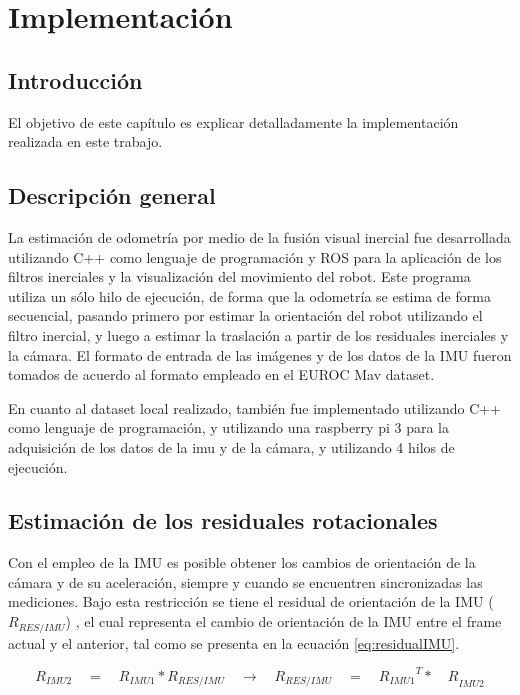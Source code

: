 \chapter{Implementación}
\label{capitulo4}


\section{Introducción}
El objetivo de este capítulo es explicar detalladamente la implementación realizada en este trabajo.
\clearpage



\section{Descripción general}\label{seccion-corte}

La estimación de odometría por medio de la fusión visual inercial fue desarrollada utilizando C++ como lenguaje de programación y ROS para la aplicación de los filtros inerciales y la visualización del movimiento del robot. Este programa utiliza un sólo hilo de ejecución, de forma que la odometría se estima de forma secuencial, pasando primero por estimar la orientación del robot utilizando el filtro inercial, y luego a estimar la traslación a partir de los residuales inerciales y la cámara. El formato de entrada de las imágenes y de los datos de la IMU fueron tomados de acuerdo al formato empleado en el EUROC Mav dataset.

En cuanto al dataset local realizado, también fue implementado utilizando C++ como lenguaje de programación, y utilizando una raspberry pi 3 para la adquisición de los datos de la imu y de la cámara, y utilizando 4 hilos de ejecución.


\section{Estimación de los residuales rotacionales}

Con el empleo de la IMU es posible obtener los cambios de orientación de la cámara y de su aceleración, siempre y cuando se encuentren sincronizadas las mediciones. Bajo esta restricción se tiene el residual de orientación de la IMU (${R}_{RES/IMU}$) , el cual representa el cambio de orientación de la IMU entre el frame actual y el anterior, tal como se presenta en la ecuación \ref{eq:residualIMU}.


\begin{equation}
{ R }_{ IMU2 }\quad =\quad { R }_{ IMU1 }*{ R }_{ RES/IMU }\quad \rightarrow \quad { R }_{ RES/IMU }\quad =\quad { { { R }_{ IMU1 } }^{ T }*\quad R }_{ IMU2 }
\label{eq:residualIMU} 
\end{equation}

